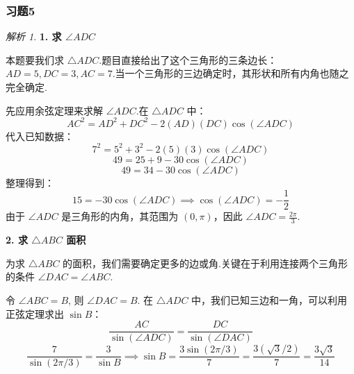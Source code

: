 \documentclass[12pt,a4paper]{ctexbook}
\theoremstyle{definition}
\theoremstyle{remark}
\newtheorem*{solution}{解析}
\begin{document}
	\subsubsection{习题5}
	\begin{solution}
		\textbf{1. 求 $\angle ADC$}
		
		本题要我们求 $\triangle ADC$.题目直接给出了这个三角形的三条边长：$AD=5, DC=3, AC=7$.当一个三角形的三边确定时，其形状和所有内角也随之完全确定.
		
		先应用余弦定理来求解 $\angle ADC$.在 $\triangle ADC$ 中：
		\[
		AC^2 = AD^2 + DC^2 - 2(AD)(DC)\cos(\angle ADC)
		\]
		代入已知数据：
		\[
		7^2 = 5^2 + 3^2 - 2(5)(3)\cos(\angle ADC)
		\]
		\[
		49 = 25 + 9 - 30\cos(\angle ADC)
		\]
		\[
		49 = 34 - 30\cos(\angle ADC)
		\]
		整理得到：
		\[
		15 = -30\cos(\angle ADC) \implies \cos(\angle ADC) = -\frac{1}{2}
		\]
		由于 $\angle ADC$ 是三角形的内角，其范围为 $(0, \pi)$，因此 $\angle ADC = \frac{2\pi}{3}$.
		
		\textbf{2. 求 $\triangle ABC$ 面积}
		
		为求 $\triangle ABC$ 的面积，我们需要确定更多的边或角.关键在于利用连接两个三角形的条件 $\angle DAC = \angle ABC$.
		
		令 $\angle ABC = B$, 则 $\angle DAC = B$.
		在 $\triangle ADC$ 中，我们已知三边和一角，可以利用正弦定理求出 $\sin B$：
		\[
		\frac{AC}{\sin(\angle ADC)} = \frac{DC}{\sin(\angle DAC)}
		\]
		\[
		\frac{7}{\sin(2\pi/3)} = \frac{3}{\sin B} \implies \sin B = \frac{3\sin(2\pi/3)}{7} = \frac{3(\sqrt{3}/2)}{7} = \frac{3\sqrt{3}}{14}
		\]
		

\end{solution}
\end{document}
